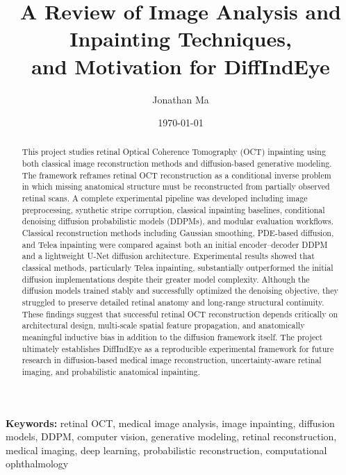 \documentclass[12pt,oneside]{article}
\title{
    A Review of Image Analysis and Inpainting Techniques,\\
    and Motivation for DiffIndEye
}
\author{
    Jonathan Ma
}
\date{\today}
\begin{document}
\maketitle

\begin{abstract}

    This project studies retinal Optical Coherence Tomography (OCT) inpainting using both classical image reconstruction methods and diffusion-based generative modeling. The framework reframes retinal OCT reconstruction as a conditional inverse problem in which missing anatomical structure must be reconstructed from partially observed retinal scans. A complete experimental pipeline was developed including image preprocessing, synthetic stripe corruption, classical inpainting baselines, conditional denoising diffusion probabilistic models (DDPMs), and modular evaluation workflows. Classical reconstruction methods including Gaussian smoothing, PDE-based diffusion, and Telea inpainting were compared against both an initial encoder--decoder DDPM and a lightweight U-Net diffusion architecture. Experimental results showed that classical methods, particularly Telea inpainting, substantially outperformed the initial diffusion implementations despite their greater model complexity. Although the diffusion models trained stably and successfully optimized the denoising objective, they struggled to preserve detailed retinal anatomy and long-range structural continuity. These findings suggest that successful retinal OCT reconstruction depends critically on architectural design, multi-scale spatial feature propagation, and anatomically meaningful inductive bias in addition to the diffusion framework itself. The project ultimately establishes DiffIndEye as a reproducible experimental framework for future research in diffusion-based medical image reconstruction, uncertainty-aware retinal imaging, and probabilistic anatomical inpainting.
    
    \end{abstract}
    
    \vspace{1em}
    
    \noindent
    \textbf{Keywords:}
    retinal OCT,
    medical image analysis,
    image inpainting,
    diffusion models,
    DDPM,
    computer vision,
    generative modeling,
    retinal reconstruction,
    medical imaging,
    deep learning,
    probabilistic reconstruction,
    computational ophthalmology
    
    \vspace{2em}
    
\end{document}
